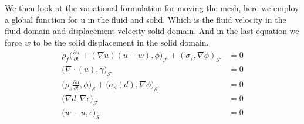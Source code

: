 We then look at the variational formulation for moving the mesh, here we employ a global function for u in the fluid and solid. Which is the fluid velocity in the fluid domain and displacement velocity solid domain. And in the last equation we force $w$ to be the solid displacement in the solid domain.
\begin{align*}
\rho_f \big( \frac{\partial u}{\partial t} + (\nabla u)(u-w) , \phi\big)_{\mathcal{F}} + (\sigma_f ,\nabla \phi )_{\mathcal{F}} &= 0  \\
 \big( \nabla \cdot (u ),\gamma \big)_{\mathcal{F}} &= 0 \\
\big(\rho_s \frac{\partial u}{\partial t},\phi \big)_{\mathcal{S}} + \big( \sigma_s(d), \nabla \phi \big)_{\mathcal{S}} &=0 \\
 \big( \nabla d , \nabla \epsilon \big)_{\mathcal{F}} &= 0 \\
 \big( w- u,\epsilon \big)_{\mathcal{S}} &= 0 \\
\end{align*}







